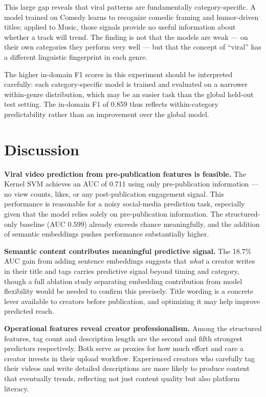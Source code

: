 \documentclass[12pt,a4paper]{article}
\begin{document}
This large gap reveals that viral patterns are fundamentally category-specific.
A model trained on Comedy learns to recognize comedic framing and humor-driven
titles; applied to Music, those signals provide no useful information about
whether a track will trend.  The finding is not that the models are weak --- on
their own categories they perform very well --- but that the concept of
``viral'' has a different linguistic fingerprint in each genre.

The higher in-domain F1 scores in this experiment should be interpreted
carefully: each category-specific model is trained and evaluated on a narrower
within-genre distribution, which may be an easier task than the global
held-out test setting.  The in-domain F1 of 0.859 thus reflects within-category
predictability rather than an improvement over the global model.

\section{Discussion}

\textbf{Viral video prediction from pre-publication features is feasible.}
The Kernel SVM achieves an AUC of 0.711 using only pre-publication information
--- no view counts, likes, or any post-publication engagement signal.  This
performance is reasonable for a noisy social-media prediction task, especially
given that the model relies solely on pre-publication information.  The
structured-only baseline (AUC 0.599) already exceeds chance meaningfully, and
the addition of semantic embeddings pushes performance substantially higher.

\textbf{Semantic content contributes meaningful predictive signal.}  The 18.7\%
AUC gain from adding sentence embeddings suggests that \textit{what} a creator
writes in their title and tags carries predictive signal beyond timing and
category, though a full ablation study separating embedding contribution from
model flexibility would be needed to confirm this precisely.  Title wording is
a concrete lever available to creators before publication, and optimizing it
may help improve predicted reach.

\textbf{Operational features reveal creator professionalism.}  Among the
structured features, tag count and description length are the second and fifth
strongest predictors respectively.  Both serve as proxies for how much effort
and care a creator invests in their upload workflow.  Experienced creators who
carefully tag their videos and write detailed descriptions are more likely to
produce content that eventually trends, reflecting not just content quality but
also platform literacy.
\end{document}
